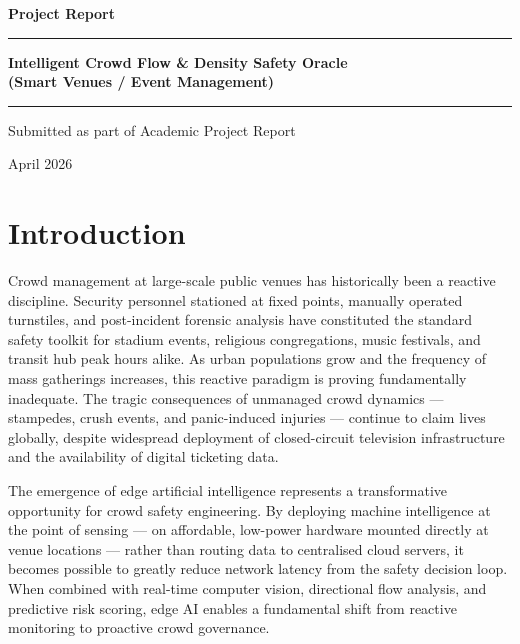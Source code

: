\documentclass[12pt,a4paper]{article}
\begin{document}
\begin{titlepage}
  \centering
  \vspace*{2cm}
  {\Huge\bfseries\color{darkblue} Project Report\par}
  \vspace{0.5cm}
  \rule{\linewidth}{1.2pt}
  \vspace{0.5cm}
  {\Large\bfseries\color{midblue}
    Intelligent Crowd Flow \& Density Safety Oracle\\[0.3em]
    \normalsize\color{gray}(Smart Venues / Event Management)
  \par}
  \vspace{0.5cm}
  \rule{\linewidth}{1.2pt}
  \vspace{1.5cm}
  {\normalsize Submitted as part of Academic Project Report\par}
  \vspace{0.3cm}
  {\normalsize April 2026\par}
  \vfill
\end{titlepage}

\newpage
\tableofcontents
\newpage

\section{Introduction}

Crowd management at large-scale public venues has historically been a reactive discipline. Security personnel stationed at fixed points, manually operated turnstiles, and post-incident forensic analysis have constituted the standard safety toolkit for stadium events, religious congregations, music festivals, and transit hub peak hours alike. As urban populations grow and the frequency of mass gatherings increases, this reactive paradigm is proving fundamentally inadequate. The tragic consequences of unmanaged crowd dynamics — stampedes, crush events, and panic-induced injuries — continue to claim lives globally, despite widespread deployment of closed-circuit television infrastructure and the availability of digital ticketing data.

The emergence of edge artificial intelligence represents a transformative opportunity for crowd safety engineering. By deploying machine intelligence at the point of sensing — on affordable, low-power hardware mounted directly at venue locations — rather than routing data to centralised cloud servers, it becomes possible to greatly reduce network latency from the safety decision loop. When combined with real-time computer vision, directional flow analysis, and predictive risk scoring, edge AI enables a fundamental shift from reactive monitoring to proactive crowd governance.
\end{document}
